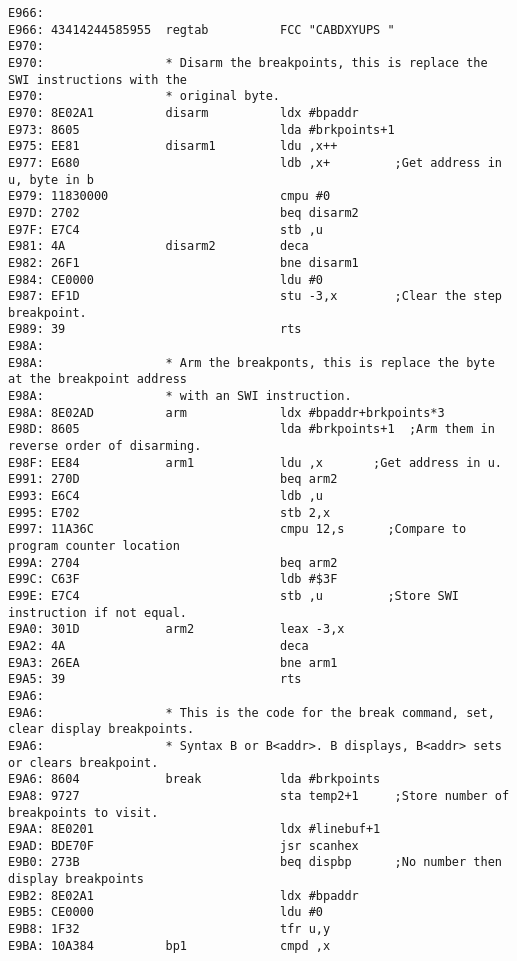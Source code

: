 {\begin{verbatim}
E966:                                 
E966: 43414244585955  regtab          FCC "CABDXYUPS "
E970:                 
E970:                 * Disarm the breakpoints, this is replace the SWI instructions with the
E970:                 * original byte.
E970: 8E02A1          disarm          ldx #bpaddr
E973: 8605                            lda #brkpoints+1
E975: EE81            disarm1         ldu ,x++        
E977: E680                            ldb ,x+         ;Get address in u, byte in b
E979: 11830000                        cmpu #0
E97D: 2702                            beq disarm2
E97F: E7C4                            stb ,u
E981: 4A              disarm2         deca
E982: 26F1                            bne disarm1
E984: CE0000                          ldu #0
E987: EF1D                            stu -3,x        ;Clear the step breakpoint.
E989: 39                              rts
E98A:                 
E98A:                 * Arm the breakponts, this is replace the byte at the breakpoint address
E98A:                 * with an SWI instruction.
E98A: 8E02AD          arm             ldx #bpaddr+brkpoints*3
E98D: 8605                            lda #brkpoints+1  ;Arm them in reverse order of disarming.
E98F: EE84            arm1            ldu ,x       ;Get address in u.
E991: 270D                            beq arm2
E993: E6C4                            ldb ,u
E995: E702                            stb 2,x
E997: 11A36C                          cmpu 12,s      ;Compare to program counter location
E99A: 2704                            beq arm2
E99C: C63F                            ldb #$3F
E99E: E7C4                            stb ,u         ;Store SWI instruction if not equal.
E9A0: 301D            arm2            leax -3,x
E9A2: 4A                              deca
E9A3: 26EA                            bne arm1                
E9A5: 39                              rts
E9A6:                 
E9A6:                 * This is the code for the break command, set, clear display breakpoints.
E9A6:                 * Syntax B or B<addr>. B displays, B<addr> sets or clears breakpoint.
E9A6: 8604            break           lda #brkpoints
E9A8: 9727                            sta temp2+1     ;Store number of breakpoints to visit.
E9AA: 8E0201                          ldx #linebuf+1
E9AD: BDE70F                          jsr scanhex
E9B0: 273B                            beq dispbp      ;No number then display breakpoints
E9B2: 8E02A1                          ldx #bpaddr
E9B5: CE0000                          ldu #0
E9B8: 1F32                            tfr u,y
E9BA: 10A384          bp1             cmpd ,x

\end{verbatim}}
